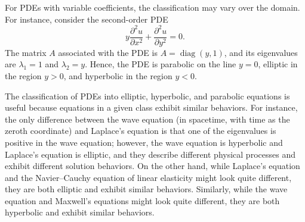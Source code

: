 \begin{example}
    For PDEs with variable coefficients, the classification may vary over the domain. For instance, consider the second-order PDE
    \[y \frac{\partial^2 u}{\partial x^2} + \frac{\partial^2 u}{\partial y^2} = 0.\]
    The matrix $A$ associated with the PDE is $A = \operatorname{diag}(y, 1)$, and its eigenvalues are $\lambda_1 = 1$ and $\lambda_2 = y$. Hence, the PDE is parabolic on the line $y = 0$, elliptic in the region $y > 0$, and hyperbolic in the region $y < 0$.
\end{example}

The classification of PDEs into elliptic, hyperbolic, and parabolic equations is useful because equations in a given class exhibit similar behaviors. For instance, the only difference between the wave equation (in spacetime, with time as the zeroth coordinate) and Laplace's equation is that one of the eigenvalues is positive in the wave equation; however, the wave equation is hyperbolic and Laplace's equation is elliptic, and they describe different physical processes and exhibit different solution behaviors. On the other hand, while Laplace's equation and the Navier--Cauchy equation of linear elasticity might look quite different, they are both elliptic and exhibit similar behaviors. Similarly, while the wave equation and Maxwell's equations might look quite different, they are both hyperbolic and exhibit similar behaviors.

